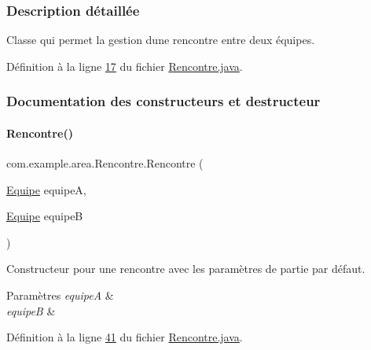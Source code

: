 \subsubsection{Description détaillée}
Classe qui permet la gestion d\textquotesingle{}une rencontre entre deux équipes. 

Définition à la ligne \hyperlink{_rencontre_8java_source_l00017}{17} du fichier \hyperlink{_rencontre_8java_source}{Rencontre.\+java}.



\subsubsection{Documentation des constructeurs et destructeur}
\mbox{\label{classcom_1_1example_1_1area_1_1_rencontre_abc915d4578268471bfab8214928bbd74}} 
\paragraph{\texorpdfstring{Rencontre()}{Rencontre()}\hspace{0.1cm}{\footnotesize\ttfamily [1/2]}}
{\footnotesize\ttfamily com.\+example.\+area.\+Rencontre.\+Rencontre (\begin{DoxyParamCaption}\item[{\hyperlink{classcom_1_1example_1_1area_1_1_equipe}{Equipe}}]{equipeA,  }\item[{\hyperlink{classcom_1_1example_1_1area_1_1_equipe}{Equipe}}]{equipeB }\end{DoxyParamCaption})}



Constructeur pour une rencontre avec les paramètres de partie par défaut. 


\begin{DoxyParams}{Paramètres}
{\em equipeA} & \\
\hline
{\em equipeB} & \\
\hline
\end{DoxyParams}


Définition à la ligne \hyperlink{_rencontre_8java_source_l00041}{41} du fichier \hyperlink{_rencontre_8java_source}{Rencontre.\+java}.



